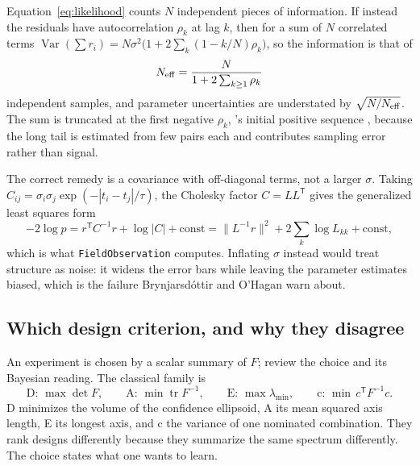 \documentclass[10pt]{article}
\begin{document}
Equation~\eqref{eq:likelihood} counts $N$ independent pieces of information. If instead the
residuals have autocorrelation $\rho_k$ at lag $k$, then for a sum of $N$ correlated terms
$\operatorname{Var}(\sum r_i) = N\sigma^2\big(1 + 2\sum_k (1-k/N)\rho_k\big)$, so the
information is that of
%
\begin{equation}
N_{\rm eff} = \frac{N}{1 + 2\sum_{k\ge1}\rho_k}
\label{eq:ess}
\end{equation}
%
independent samples, and parameter uncertainties are understated by
$\sqrt{N/N_{\rm eff}}$. The sum is truncated at the first negative $\rho_k$, \citeauthor{geyer1992practical}'s
initial positive sequence \citep{geyer1992practical}, because the long tail is estimated from few pairs each and
contributes sampling error rather than signal.

The correct remedy is a covariance with off-diagonal terms, not a larger $\sigma$. Taking
$C_{ij} = \sigma_i\sigma_j\exp(-|t_i-t_j|/\tau)$, the Cholesky factor $C = LL^{\mathsf T}$
gives the generalized least squares form
%
\begin{equation}
-2\log p = r^{\mathsf T}C^{-1}r + \log|C| + \text{const}
= \|L^{-1}r\|^2 + 2\sum_k \log L_{kk} + \text{const},
\end{equation}
%
which is what \texttt{FieldObservation} computes. Inflating $\sigma$ instead would treat
structure as noise: it widens the error bars while leaving the parameter estimates biased,
which is the failure Brynjarsd\'ottir and O'Hagan warn about.

\subsection{Which design criterion, and why they disagree}
\label{sec:criteria}

An experiment is chosen by a scalar summary of $F$; \citet{chaloner1995bayesian} review the
choice and its Bayesian reading. The classical family is
%
\begin{equation}
\text{D: } \max \det F, \qquad
\text{A: } \min \operatorname{tr} F^{-1}, \qquad
\text{E: } \max \lambda_{\min}, \qquad
\text{c: } \min\, c^{\mathsf T}F^{-1}c .
\end{equation}
%
D minimizes the volume of the confidence ellipsoid, A its mean squared axis length, E its
longest axis, and c the variance of one nominated combination. They rank designs differently
because they summarize the same spectrum differently. The choice states what one wants to
learn.
\end{document}
